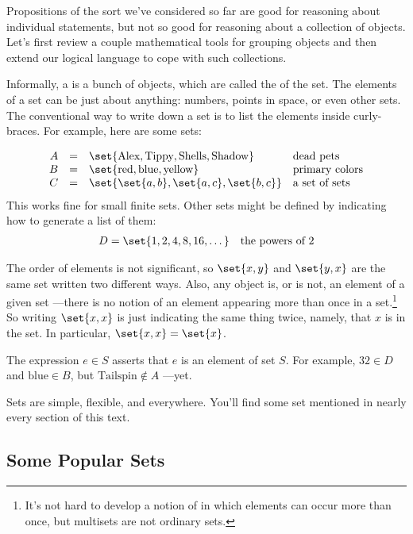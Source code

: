 Propositions of the sort we've considered so far are good for
reasoning about individual statements, but not so good for reasoning
about a collection of objects.  Let's first review a couple
mathematical tools for grouping objects and then extend our logical
language to cope with such collections.

Informally, a  is a bunch of objects, which are called the
 of the set.  The elements of a set can be just about
anything: numbers, points in space, or even other sets.  The conventional
way to write down a set is to list the elements inside curly-braces.  For
example, here are some sets:

\[
\begin{array}{rcll}
A & = & \set{\text{Alex}, \text{Tippy}, \text{Shells}, \text{Shadow}} & \text{dead pets} \\
B & = & \set{\text{red}, \text{blue}, \text{yellow}} & \text{primary colors} \\
C & = & \set{ \set{a, b}, \set{a, c}, \set{b, c}} & \text{a set of sets}
\end{array}
\]
This works fine for small finite sets.  Other sets might be defined by
indicating how to generate a list of them:
\begin{align*}
D & =  \set{1,2,4,8,16,\dots} & \text{the powers of 2}
\end{align*}

The order of elements is not significant, so $\set{x, y}$ and $\set{y, x}$
are the same set written two different ways.  Also, any object is, or is
not, an element of a given set ---there is no notion of an element
appearing more than once in a set.\footnote{It's not hard to develop a
notion of  in which elements can occur more than once, but
multisets are not ordinary sets.}  So writing $\set{x,x}$ is just
indicating the same thing twice, namely, that $x$ is in the set.  In
particular, $\set{x,x} = \set{x}$.

The expression $e \in S$ asserts that $e$ is an element of set $S$.  For
example, $32 \in D$ and $\text{blue} \in B$, but $\text{Tailspin}
\not\in A$ ---yet.

Sets are simple, flexible, and everywhere.  You'll find
some set mentioned in nearly every section of this text.

\subsection{Some Popular Sets}

